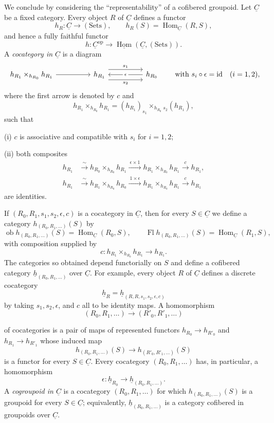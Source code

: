 We conclude by considering the ``representability'' of a cofibered
groupoid. Let $\underline C$ be a fixed category. Every object $R$ of
$\underline C$ defines a functor
\[
 h_R:\underline C\longrightarrow(\mathrm{Sets}),
 \qquad h_R(S)=\operatorname{Hom}_{\underline C}(R,S),
\]
and hence a fully faithful functor
\[
 h:\underline C^{\mathrm{op}}
 \longrightarrow
 \underline{\operatorname{Hom}}(\underline C,(\mathrm{Sets})).
\]
A \emph{cocategory in $\underline C$} is a diagram
\[
\begin{tikzcd}[column sep=huge]
 h_{R_1}\times_{h_{R_0}}h_{R_1} \arrow[r]
 & h_{R_1}
   \arrow[r,shift left=3,"{s_1}"]
   \arrow[r,shift right=3,"{s_2}"']
 & h_{R_0} \arrow[l,"{\epsilon}" description]
\end{tikzcd}
\qquad
\text{with }s_i\circ\epsilon=\operatorname{id}\quad(i=1,2),
\]
where the first arrow is denoted by $c$ and
\[
 h_{R_1}\times_{h_{R_0}}h_{R_1}
 = (h_{R_1})_{s_1}\times_{h_{R_0}}{}_{s_2}(h_{R_1}),
\]
such that

(i) $c$ is associative and compatible with $s_i$ for $i=1,2$;

(ii) both composites
\begin{align*}
 h_{R_1}&\xrightarrow{\ \sim\ }
 h_{R_0}\times_{h_{R_0}}h_{R_1}
 \xrightarrow{\ \epsilon\times1\ }
 h_{R_1}\times_{h_{R_0}}h_{R_1}
 \xrightarrow{\ c\ }h_{R_1},\\[1ex]
 h_{R_1}&\xrightarrow{\ \sim\ }
 h_{R_1}\times_{h_{R_0}}h_{R_0}
 \xrightarrow{\ 1\times\epsilon\ }
 h_{R_1}\times_{h_{R_0}}h_{R_1}
 \xrightarrow{\ c\ }h_{R_1}
\end{align*}
are identities.

If $(R_0,R_1,s_1,s_2,\epsilon,c)$ is a cocategory in
$\underline C$, then for every $S\in\underline C$ we define a
category $h_{(R_0,R_1,\ldots)}(S)$ by
\[
 \operatorname{ob}h_{(R_0,R_1,\ldots)}(S)
   =\operatorname{Hom}_{\underline C}(R_0,S),
 \qquad
 \operatorname{Fl}h_{(R_0,R_1,\ldots)}(S)
   =\operatorname{Hom}_{\underline C}(R_1,S),
\]
with composition supplied by
\[
 c:h_{R_1}\times_{h_{R_0}}h_{R_1}\longrightarrow h_{R_1}.
\]
The categories so obtained depend functorially on $S$ and define a
cofibered category
$\underline h_{(R_0,R_1,\ldots)}$ over $\underline C$. For example,
every object $R$ of $\underline C$ defines a discrete cocategory
\[
 \underline h_R
 =\underline h_{(R,R,s_1,s_2,\epsilon,c)}
\]
by taking $s_1,s_2,\epsilon$, and $c$ all to be identity maps. A
homomorphism
\[
 (R_0,R_1,\ldots)\longrightarrow(R'_0,R'_1,\ldots)
\]


of cocategories is a pair of maps of represented functors
$h_{R_0}\longrightarrow h_{R'_0}$ and
$h_{R_1}\longrightarrow h_{R'_1}$ whose induced map
\[
 h_{(R_0,R_1,\ldots)}(S)
 \longrightarrow h_{(R'_0,R'_1,\ldots)}(S)
\]
is a functor for every $S\in\underline C$. Every cocategory
$(R_0,R_1,\ldots)$ has, in particular, a homomorphism
\[
 \epsilon:\underline h_{R_0}
 \longrightarrow\underline h_{(R_0,R_1,\ldots)}.
\]
A \emph{cogroupoid in $\underline C$} is a cocategory
$(R_0,R_1,\ldots)$ for which $h_{(R_0,R_1,\ldots)}(S)$ is a groupoid
for every $S\in\underline C$; equivalently,
$\underline h_{(R_0,R_1,\ldots)}$ is a category cofibered in
groupoids over $\underline C$.

